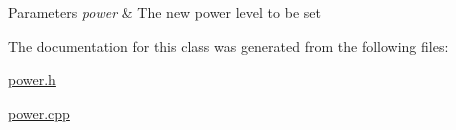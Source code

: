 \begin{DoxyParams}{Parameters}
{\em power} & The new power level to be set \\
\hline
\end{DoxyParams}


The documentation for this class was generated from the following files\+:\begin{DoxyCompactItemize}
\item 
\hyperlink{power_8h}{power.\+h}\item 
\hyperlink{power_8cpp}{power.\+cpp}\end{DoxyCompactItemize}
